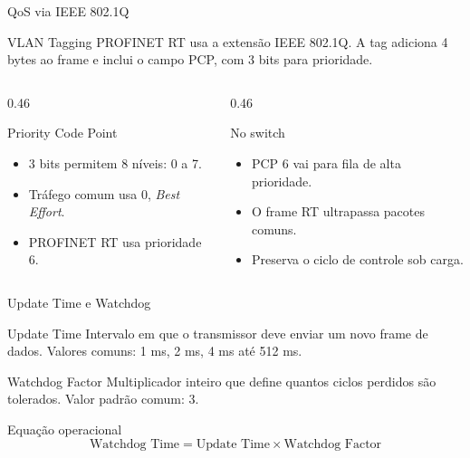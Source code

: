 \documentclass[10pt, aspectratio=169]{beamer}
\begin{document}
\begin{frame}{QoS via IEEE 802.1Q}
    \small
    \begin{block}{VLAN Tagging}
        PROFINET RT usa a extens\~ao IEEE 802.1Q. A tag adiciona 4 bytes ao frame e inclui o campo PCP, com 3 bits para prioridade.
    \end{block}

    \begin{columns}[T,totalwidth=\textwidth]
        \begin{column}{0.46\textwidth}
            \begin{block}{Priority Code Point}
                \begin{itemize}
                    \item 3 bits permitem 8 n\'iveis: 0 a 7.
                    \item Tr\'afego comum usa 0, \textit{Best Effort}.
                    \item PROFINET RT usa \alert{prioridade 6}.
                \end{itemize}
            \end{block}
        \end{column}
        \begin{column}{0.46\textwidth}
            \begin{block}{No switch}
                \begin{itemize}
                    \item PCP 6 vai para fila de alta prioridade.
                    \item O frame RT ultrapassa pacotes comuns.
                    \item Preserva o ciclo de controle sob carga.
                \end{itemize}
            \end{block}
        \end{column}
    \end{columns}
\end{frame}

\begin{frame}{Update Time e Watchdog}
    \small
    \begin{block}{Update Time}
        Intervalo em que o transmissor deve enviar um novo frame de dados. Valores comuns: 1 ms, 2 ms, 4 ms at\'e 512 ms.
    \end{block}

    \begin{block}{Watchdog Factor}
        Multiplicador inteiro que define quantos ciclos perdidos s\~ao tolerados. Valor padr\~ao comum: 3.
    \end{block}

    \begin{block}{Equa\c{c}\~ao operacional}
        \[
            \text{Watchdog Time} = \text{Update Time} \times \text{Watchdog Factor}
        \]
    \end{block}
\end{frame}
\end{document}
